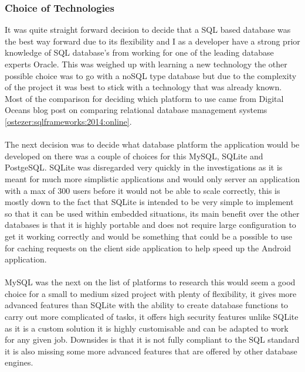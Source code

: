 \subsubsection*{Choice of Technologies}
\label{sec:database_choice_of_tech}
 
It was quite straight forward decision to decide that a SQL based database was the best way forward due to its flexibility and I as a developer have a strong prior knowledge of SQL database's from working for one of the leading database experts Oracle. This was weighed up with learning a new technology the other possible choice was to go with a noSQL type database but due to the complexity of the project it was best to stick with a technology that was already known. Most of the comparison for deciding which platform to use came from Digital Oceans blog post on comparing relational database management systems \ref{ostezer:sqlframeworks:2014:online}.\\
\\
The next decision was to decide what database platform the application would be developed on there was a couple of choices for this MySQL, SQLite and PostgeSQL. SQLite was disregarded very quickly in the investigations as it is meant for much more simplistic applications and would only server an application with a max of 300 users before it would not be able to scale correctly, this is mostly down to the fact that SQLite is intended to be very simple to implement so that it can be used within embedded situations, its main benefit over the other databases is that it is highly portable and does not require large configuration to get it working correctly and would be something that could be a possible to use for caching requests on the client side application to help speed up the Android application.\\
\\
MySQL was the next on the list of platforms to research this would seem a good choice for a small to medium sized project with plenty of flexibility, it gives more advanced features than SQLite with the ability to create database functions to carry out more complicated of tasks, it offers high security features unlike SQLite as it is a custom solution it is highly customisable and can be adapted to work for any given job. Downsides is that it is not fully compliant to the SQL standard it is also missing some more advanced features that are offered by other database engines.\\
\\

